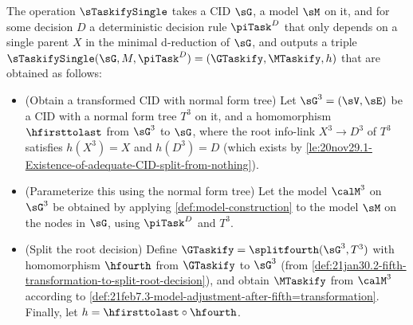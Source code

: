 \begin{definition}  \label{def:taskify-construction-single}
The operation $\sTaskifySingle$ takes a CID $\sG$, a model $\sM$ on it, and for some decision $D$ a deterministic decision rule $\piTask^{D}$ that only depends on a single parent $X$ in the minimal d-reduction of $\sG$, and outputs a triple $\sTaskifySingle(\sG, M, \piTask^{D}) = (\GTaskify, \MTaskify, h)$ that are obtained as follows:
\begin{itemize}
    \item (Obtain a transformed CID with normal form tree) Let  $\sG^3=(\sV,\sE)$ be a CID
    with a normal form tree $T^3$ on it, and a homomorphism $\hfirsttolast$ from $\sG^3$ to $\sG$, where the root info-link $X^3 \to D^3$ of $T^3$ satisfies $h(X^3)=X$ and $h(D^3)=D$ (which exists by \autoref{le:20nov29.1-Existence-of-adequate-CID-split-from-nothing}). 
    
    \item (Parameterize this using the normal form tree) Let the model $\calM^3$ on $\sG^3$ be obtained by applying \autoref{def:model-construction} to the model $\sM$ on the nodes in $\sG$, using $\piTask^{D}$ and $T^3$.
    
    \item (Split the root decision) Define $\GTaskify=\splitfourth(\sG^3, T^3)$ with homomorphism $\hfourth$ from $\GTaskify$ to $\sG^3$ (from  \autoref{def:21jan30.2-fifth-transformation-to-split-root-decision}), and obtain $\MTaskify$ from $\calM^3$ according to \autoref{def:21feb7.3-model-adjustment-after-fifth=transformation}. Finally, let $h=\hfirsttolast\circ \hfourth$.
\end{itemize}
\end{definition}




